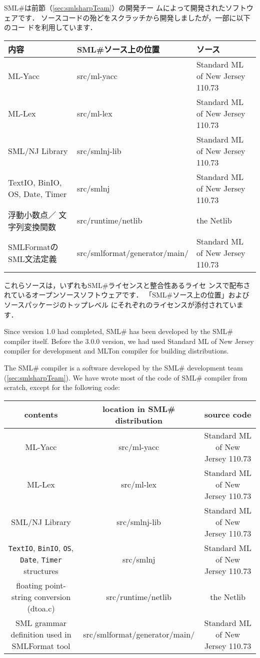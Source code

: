 \documentclass{jbook}
\newcommand{\smlsharp}{SML\#}
\newcommand{\version}{3.0.0}
\begin{document}
	\smlsharp{}は前節（\ref{sec:smlsharpTeam}）の開発チー
ムによって開発されたソフトウェアです．
	ソースコードの殆どをスクラッチから開発しましたが，一部に以下のコー
ドを利用しています．

\begin{center}
\begin{tabular}{|l|l|l|}
\hline
内容 & \smlsharp{}ソース上の位置 & ソース
\\\hline
ML-Yacc & src/ml-yacc  & Standard ML of New Jersey 110.73
\\\hline
ML-Lex & src/ml-lex  & Standard ML of New Jersey 110.73
\\\hline
SML/NJ Library & src/smlnj-lib &  Standard ML of New Jersey 110.73
\\\hline
TextIO,
BinIO,
OS,
Date,
Timer
&
src/smlnj
&
Standard ML of New Jersey 110.73
\\\hline
浮動小数点／
文字列変換関数
&
src/runtime/netlib
&
the Netlib
\\\hline
SMLFormatの
SML文法定義
&
src/smlformat/generator/main/
&
Standard ML of New Jersey 110.73
\\\hline
\end{tabular}
\end{center}

	これらソースは，いずれも\smlsharp{}ライセンスと整合性あるライセ
ンスで配布されているオープンソースソフトウェアです．
	「\smlsharp{}ソース上の位置」およびソースパッケージのトップレベル
にそれぞれのライセンスが添付されています．
\else%

	Since version 1.0 had completed, \smlsharp{} has been
developed by the \smlsharp{} compiler itself.
	Before the \version{} version, we had used Standard ML of New
Jersey compiler for development and MLTon compiler for building
distributions.

	The \smlsharp{} compiler is a software developed by the
\smlsharp{} development team (\ref{sec:smlsharpTeam}).
	We have wrote most of the code of \smlsharp{} compiler from
scratch, except for the following code: 

\begin{center}
\begin{tabular}{|c|c|c|}
\hline
contents & location in \smlsharp{} distribution & source code
\\\hline
ML-Yacc & src/ml-yacc  & Standard ML of New Jersey 110.73
\\\hline
ML-Lex & src/ml-lex  & Standard ML of New Jersey 110.73
\\\hline
SML/NJ Library & src/smlnj-lib &  Standard ML of New Jersey 110.73
\\\hline
{\tt TextIO},
{\tt BinIO},
{\tt OS},
{\tt Date},
{\tt Timer}
structures
&
src/smlnj
&
Standard ML of New Jersey 110.73
\\\hline
floating point-string conversion
(dtoa.c)
&
src/runtime/netlib
&
the Netlib
\\\hline
SML grammar definition used 
in SMLFormat tool
&
src/smlformat/generator/main/
&
Standard ML of New Jersey 110.73
\\\hline
\end{tabular}
\end{center}
\end{document}
